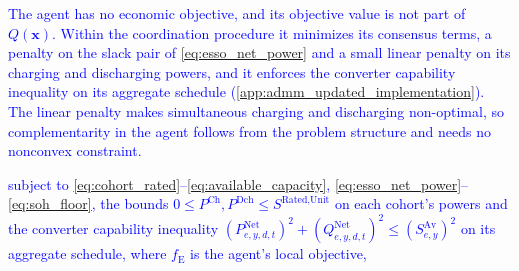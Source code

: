 \textcolor{blue}{
    The agent has no economic objective, and its objective value is not part of $Q(\boldsymbol{x})$. Within the coordination procedure it minimizes its consensus terms, a penalty on the slack pair of \eqref{eq:esso_net_power} and a small linear penalty on its charging and discharging powers, and it enforces the converter capability inequality on its aggregate schedule (\ref{app:admm_updated_implementation}). The linear penalty makes simultaneous charging and discharging non-optimal, so complementarity in the agent follows from the problem structure and needs no nonconvex constraint.
}

\noindent
\textcolor{blue}{
    subject to \eqref{eq:cohort_rated}--\eqref{eq:available_capacity}, \eqref{eq:esso_net_power}--\eqref{eq:soh_floor}, the bounds $0 \le P^{\text{Ch}}, P^{\text{Dch}} \le S^{\text{Rated,Unit}}$ on each cohort's powers and the converter capability inequality $(P^{\text{Net}}_{e,y,d,t})^2 + (Q^{\text{Net}}_{e,y,d,t})^2 \le (S^{\text{Av}}_{e,y})^2$ on its aggregate schedule, where $f_{\text{E}}$ is the agent's local objective,
}

